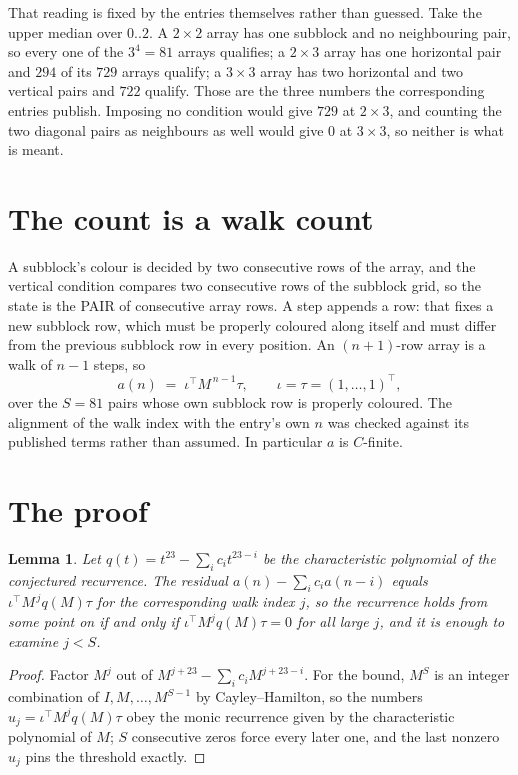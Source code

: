 \documentclass[11pt,a4paper]{article}
\theoremstyle{plain}
\newtheorem{lemma}[theorem]{Lemma}
\theoremstyle{definition}
\begin{document}
That reading is fixed by the entries themselves rather than guessed. Take the upper median
over $0..2$. A $2\times2$ array has one subblock and no neighbouring pair, so every one of the
$3^4=81$ arrays qualifies; a $2\times3$ array has one horizontal pair and $294$ of its $729$
arrays qualify; a $3\times3$ array has two horizontal and two vertical pairs and $722$
qualify. Those are the three numbers the corresponding entries publish. Imposing no condition
would give $729$ at $2\times3$, and counting the two diagonal pairs as neighbours as well
would give $0$ at $3\times3$, so neither is what is meant.

\section{The count is a walk count}

A subblock's colour is decided by two consecutive rows of the array, and
the vertical condition compares two consecutive rows of the subblock grid, so the state is the
PAIR of consecutive array rows. A step appends a row: that fixes a new subblock row, which
must be properly coloured along itself and must differ from the previous subblock row in every
position. An $(n+1)$-row array is a walk of $n-1$ steps, so
\[
a(n)\;=\;\iota^{\!\top}M^{\,n-1}\tau,\qquad\iota=\tau=(1,\dots,1)^{\!\top},
\]
over the $S=81$ pairs whose own subblock row is properly coloured.
The alignment of the walk index with the entry's own $n$ was checked against its published
terms rather than assumed. In particular $a$ is $C$-finite.

\section{The proof}

\begin{lemma}\label{lem:crit}
Let $q(t)=t^{23}-\sum_i c_it^{23-i}$ be the characteristic polynomial of the
conjectured recurrence. The residual $a(n)-\sum_ic_ia(n-i)$ equals
$\iota^{\!\top}M^{\,j}q(M)\tau$ for the corresponding walk index $j$, so the recurrence
holds from some point on if and only if $\iota^{\!\top}M^{j}q(M)\tau=0$ for all large $j$,
and it is enough to examine $j<S$.
\end{lemma}

\begin{proof}
Factor $M^{j}$ out of $M^{j+23}-\sum_ic_iM^{j+23-i}$. For the bound, $M^{S}$
is an integer combination of $I,M,\dots,M^{S-1}$ by Cayley--Hamilton, so the numbers
$u_j=\iota^{\!\top}M^{j}q(M)\tau$ obey the monic recurrence given by the characteristic
polynomial of $M$; $S$ consecutive zeros force every later one, and the last nonzero $u_j$
pins the threshold exactly.
\end{proof}
\end{document}

